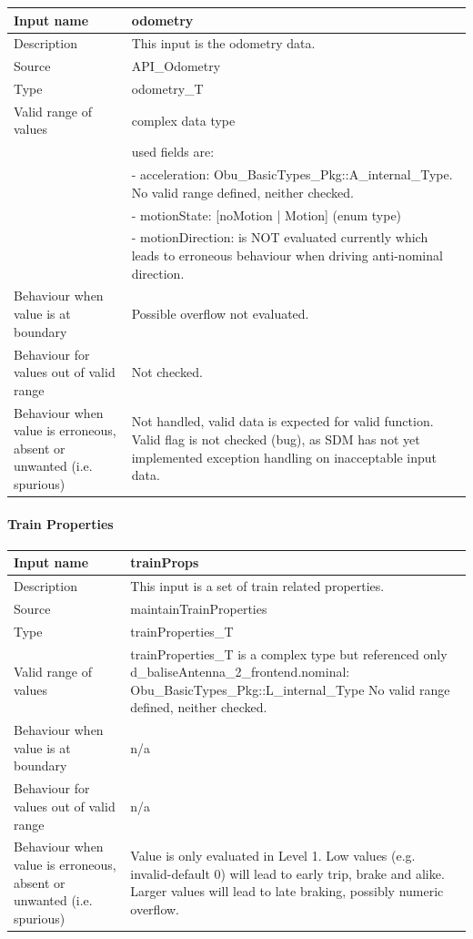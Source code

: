 \begin{longtable}{p{}p{}}
\toprule
Input name				& odometry \\
\midrule
Description				& This input is the odometry data. \\
\midrule
Source					& API\_Odometry \\ 
\midrule
Type					& odometry\_T \\
\midrule
Valid range of values	& complex data type \\
 & used fields are: \\
 & - acceleration: Obu\_BasicTypes\_Pkg::A\_internal\_Type. No valid range defined, neither checked. \\
 & - motionState: [noMotion | Motion] (enum type) \\
 & - motionDirection: is NOT evaluated currently which leads to erroneous behaviour when driving anti-nominal direction.\\
\midrule
Behaviour when value is at boundary	& Possible overflow not evaluated. \\
\midrule
Behaviour for values out of valid range	& Not checked. \\
\midrule
Behaviour when value is erroneous, absent or unwanted (i.e. spurious) & Not handled, valid data is expected for valid function. Valid flag is not checked (bug), as SDM has not yet implemented exception handling on inacceptable input data.\\
\bottomrule
\end{longtable}


\paragraph{Train Properties}

\begin{longtable}{p{}p{}}
\toprule
Input name				& trainProps \\
\midrule
Description				& This input is a set of train related properties. \\
\midrule
Source					& maintainTrainProperties \\ 
\midrule
Type					& trainProperties\_T \\
\midrule
Valid range of values	& trainProperties\_T is a complex type but referenced only d\_baliseAntenna\_2\_frontend.nominal: Obu\_BasicTypes\_Pkg::L\_internal\_Type No valid range defined, neither checked. \\
\midrule
Behaviour when value is at boundary	& n/a \\
\midrule
Behaviour for values out of valid range	& n/a \\
\midrule
Behaviour when value is erroneous, absent or unwanted (i.e. spurious) & Value is only evaluated in Level 1. Low values (e.g. invalid-default 0) will lead to early trip, brake and alike. Larger values will lead to late braking, possibly numeric overflow. \\
\bottomrule
\end{longtable}


